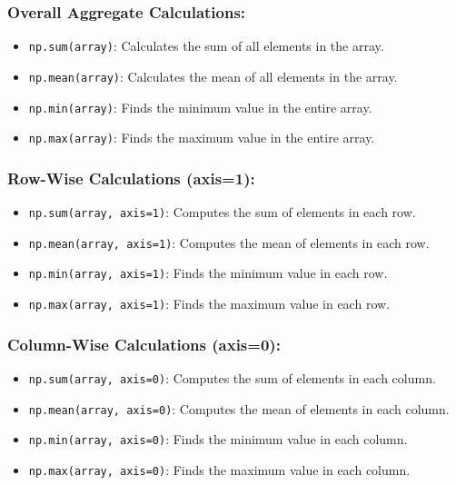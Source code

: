 \documentclass[
  letterpaper,
  DIV=11,
  numbers=noendperiod]{scrreprt}
\providecommand{\tightlist}{%
  \setlength{\itemsep}{0pt}\setlength{\parskip}{0pt}}\usepackage{longtable,booktabs,array}
\begin{document}
\hypertarget{overall-aggregate-calculations}{%
\subsubsection{Overall Aggregate
Calculations:}\label{overall-aggregate-calculations}}

\begin{itemize}
\tightlist
\item
  \texttt{np.sum(array)}: Calculates the sum of all elements in the
  array.
\item
  \texttt{np.mean(array)}: Calculates the mean of all elements in the
  array.
\item
  \texttt{np.min(array)}: Finds the minimum value in the entire array.
\item
  \texttt{np.max(array)}: Finds the maximum value in the entire array.
\end{itemize}

\hypertarget{row-wise-calculations-axis1}{%
\subsubsection{Row-Wise Calculations
(axis=1):}\label{row-wise-calculations-axis1}}

\begin{itemize}
\tightlist
\item
  \texttt{np.sum(array,\ axis=1)}: Computes the sum of elements in each
  row.
\item
  \texttt{np.mean(array,\ axis=1)}: Computes the mean of elements in
  each row.
\item
  \texttt{np.min(array,\ axis=1)}: Finds the minimum value in each row.
\item
  \texttt{np.max(array,\ axis=1)}: Finds the maximum value in each row.
\end{itemize}

\hypertarget{column-wise-calculations-axis0}{%
\subsubsection{Column-Wise Calculations
(axis=0):}\label{column-wise-calculations-axis0}}

\begin{itemize}
\tightlist
\item
  \texttt{np.sum(array,\ axis=0)}: Computes the sum of elements in each
  column.
\item
  \texttt{np.mean(array,\ axis=0)}: Computes the mean of elements in
  each column.
\item
  \texttt{np.min(array,\ axis=0)}: Finds the minimum value in each
  column.
\item
  \texttt{np.max(array,\ axis=0)}: Finds the maximum value in each
  column.
\end{itemize}
\end{document}
